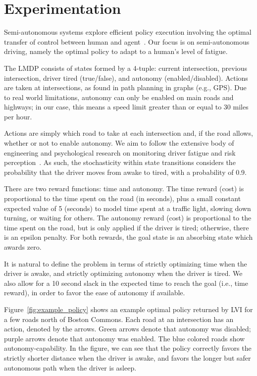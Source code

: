 \section{Experimentation}
\label{sec:experimentation}

Semi-autonomous systems explore efficient policy execution involving the optimal transfer of control between human and agent~\cite{Cohn11-SemiAutonomousAgents}. Our focus is on semi-autonomous driving, namely the optimal policy to adapt to a human's level of fatigue.

The LMDP consists of states formed by a 4-tuple: current intersection, previous intersection, driver tired (true/false), and autonomy (enabled/disabled). Actions are taken at intersections, as found in path planning in graphs (e.g., GPS). Due to real world limitations, autonomy can only be enabled on main roads and highways; in our case, this means a speed limit greater than or equal to 30 miles per hour.

Actions are simply which road to take at each intersection and, if the road allows, whether or not to enable autonomy. We aim to follow the extensive body of engineering and psychological research on monitoring driver fatigue and risk perception~\cite{Ji04-RealTimeMonitoringDriverFatigue,Pradhan05-UsingEyeMovementsDriverRiskPerception}. As such, the stochasticity within state transitions considers the probability that the driver moves from awake to tired, with a probability of 0.9.

There are two reward functions: time and autonomy. The time reward (cost) is proportional to the time spent on the road (in seconds), plus a small constant expected value of 5 (seconds) to model time spent at a traffic light, slowing down turning, or waiting for others. The autonomy reward (cost) is proportional to the time spent on the road, but is only applied if the driver is tired; otherwise, there is an epsilon penalty. For both rewards, the goal state is an absorbing state which awards zero.

It is natural to define the problem in terms of strictly optimizing time when the driver is awake, and strictly optimizing autonomy when the driver is tired. We also allow for a 10 second slack in the expected time to reach the goal (i.e., time reward), in order to favor the ease of autonomy if available.

Figure~\ref{fig:example_policy} shows an example optimal policy returned by LVI for a few roads north of Boston Commons. Each road at an intersection has an action, denoted by the arrows. Green arrows denote that autonomy was disabled; purple arrows denote that autonomy was enabled. The blue colored roads show autonomy-capability. In the figure, we can see that the policy correctly favors the strictly shorter distance when the driver is awake, and favors the longer but safer autonomous path when the driver is asleep.

